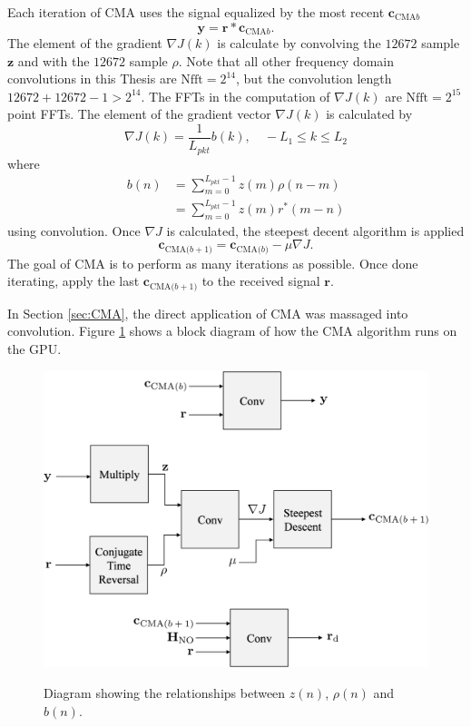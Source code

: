 Each iteration of CMA uses the signal equalized by the most recent $\mathbf{c}_{\text{CMA}b}$
\begin{equation}
\mathbf{y} = \mathbf{r}*\mathbf{c}_{\text{CMA}b}.
\end{equation}
The element of the gradient $\nabla J(k)$ is calculate by convolving the $12672$ sample $\mathbf{z}$ and with the $12672$ sample $\rho$. 
Note that all other frequency domain convolutions in this Thesis are $\text{Nfft} = 2^{14}$, but the convolution length $12672+12672-1>2^{14}$. The FFTs in the computation of $\nabla J(k)$ are $\text{Nfft} = 2^{15}$ point FFTs.
The element  of the gradient vector $\nabla J(k)$ is calculated by
\begin{equation}
\nabla J(k) = \frac{1}{L_{pkt}} b(k), \quad -L_1 \leq k \leq L_2
\end{equation}
where
\begin{align}
b(n) &= \sum^{L_{pkt}-1}_{m=0} z(m) \rho(n-m) \nonumber \\
	 &= \sum^{L_{pkt}-1}_{m=0} z(m) r^\ast(m-n)
\end{align}
using convolution.
Once $\nabla J$ is calculated, the steepest decent algorithm is applied
\begin{equation}
\mathbf{c}_\text{CMA($b+1$)} = \mathbf{c}_\text{CMA($b$)}-\mu \nabla J.
\end{equation}
The goal of CMA is to perform as many iterations as possible.
Once done iterating, apply the last $\mathbf{c}_\text{CMA($b+1$)}$ to the received signal $\mathbf{r}$.

In Section \ref{sec:CMA}, the direct application of CMA was massaged into convolution.
Figure \ref{fig:blockCMA} shows a block diagram of how the CMA algorithm runs on the GPU.
\begin{figure}
	\caption{Diagram showing the relationships between $z(n)$, $\rho(n)$ and $b(n)$.}
	\centering\includegraphics[width=8.34in/100*55]{figures/eq_GPUimplementation/blockCMA.pdf}
	\label{fig:blockCMA}
\end{figure}


